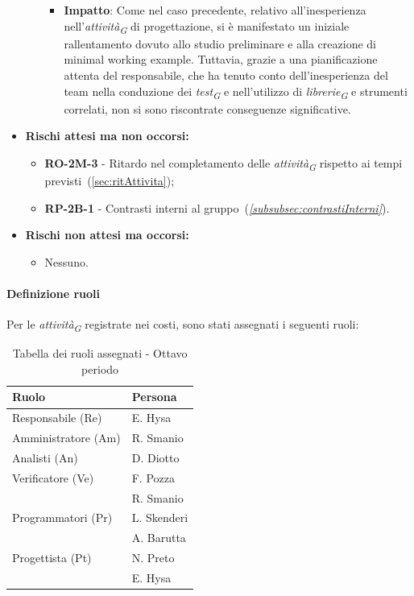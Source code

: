 \begin{itemize}
\begin{itemize}
\begin{itemize}
            \item \textbf{Impatto}: Come nel caso precedente, relativo all'inesperienza nell'\textit{attività}\textsubscript{\textit{G}} di progettazione, si è manifestato un iniziale rallentamento dovuto allo studio preliminare e alla creazione di minimal working example. Tuttavia, grazie a una pianificazione attenta del responsabile, che ha tenuto conto dell'inesperienza del team nella conduzione dei \textit{test}\textsubscript{\textit{G}} e nell'utilizzo di \textit{librerie}\textsubscript{\textit{G}} e strumenti correlati, non si sono riscontrate conseguenze significative.
        \end{itemize}
\end{itemize}
\item \textbf{Rischi attesi ma non occorsi:}
 \begin{itemize}
    \item \textbf{RO-2M-3} - Ritardo nel completamento delle \textit{attività}\textsubscript{\textit{G}} rispetto ai tempi previsti~(\ref{sec:ritAttivita});
    \item \textbf{RP-2B-1} - Contrasti interni al gruppo~(\textit{\ref{subsubsec:contrastiInterni}}).
\end{itemize}
\item \textbf{Rischi non attesi ma occorsi:}
\begin{itemize}
    \item Nessuno.
\end{itemize}
\end{itemize}

\paragraph{Definizione ruoli}
Per le \textit{attività}\textsubscript{\textit{G}} registrate nei costi, sono stati assegnati i seguenti ruoli: 

\begin{table}[H]
    \centering
    \begin{tabular}{|L{4cm}|L{2cm}|}
        \hline
        \textbf{Ruolo} & \textbf{Persona} \\
        \hline
        \hline
        Responsabile (Re)   & E. Hysa \\
        \hline
        Amministratore (Am) & R. Smanio \\
        \hline
        Analisti (An)       & D. Diotto \\
        \hline
        Verificatore (Ve)   & F. Pozza \\
                            & R. Smanio \\   
        \hline
        Programmatori (Pr)  & L. Skenderi \\
                            & A. Barutta \\
        \hline
        Progettista (Pt)    & N. Preto \\
                            & E. Hysa \\
        \hline
    \end{tabular}
    \caption{Tabella dei ruoli assegnati - Ottavo periodo}
    \label{tab:Ruoli_persone_8}
\end{table}

